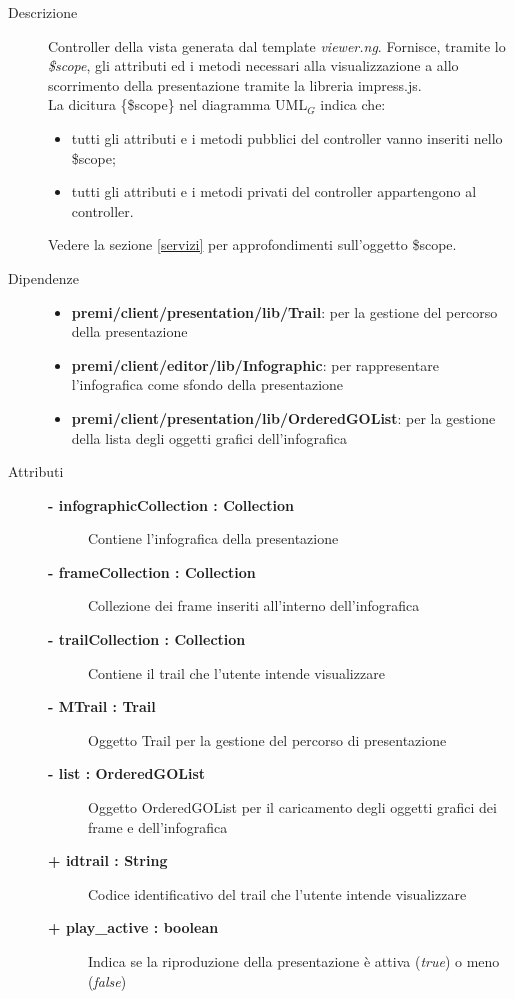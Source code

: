 \begin{description}
\item[Descrizione] \hfill
	Controller della vista generata dal template \textit{viewer.ng}. Fornisce, tramite lo \textit{\$scope}, gli attributi ed i metodi necessari alla visualizzazione a allo scorrimento della presentazione tramite la libreria impress.js.
	\\ La dicitura \{\$scope\} nel diagramma UML$_G$ indica che:
\begin{itemize}
\item tutti gli attributi e i metodi pubblici del controller vanno inseriti nello \$scope;
\item tutti gli attributi e i metodi privati del controller appartengono al controller.
\end{itemize}
Vedere la sezione \ref{servizi} per approfondimenti sull'oggetto \$scope.
	
	
	
\item[Dipendenze] \hfill
	\begin{itemize}
		\item \textbf{premi/client/presentation/lib/Trail}: per la gestione del percorso della presentazione
		\item \textbf{premi/client/editor/lib/Infographic}: per rappresentare l'infografica come sfondo della presentazione
		\item \textbf{premi/client/presentation/lib/OrderedGOList}: per la gestione della lista degli oggetti grafici dell'infografica
	\end{itemize}
	
	
\item[Attributi] \hfill
	\begin{description}
		\item[\textbf{- infographicCollection : Collection			}] \hfill
			Contiene l'infografica della presentazione
		\item[\textbf{- frameCollection : Collection			}] \hfill
			Collezione dei frame inseriti all'interno dell'infografica
		\item[\textbf{- trailCollection : Collection			}] \hfill
			Contiene il trail che l'utente intende visualizzare
		\item[\textbf{- MTrail : Trail			}] \hfill
			Oggetto Trail per la gestione del percorso di presentazione
		\item[\textbf{- list : OrderedGOList			}] \hfill
			Oggetto OrderedGOList per il caricamento degli oggetti grafici dei frame e dell'infografica
		\item[\textbf{+ idtrail : String			}] \hfill
			Codice identificativo del trail che l'utente intende visualizzare
		\item[\textbf{+ play\_active : boolean			}] \hfill
			Indica se la riproduzione della presentazione è attiva (\textit{true}) o meno (\textit{false})
	\end{description}
	

\end{description}
